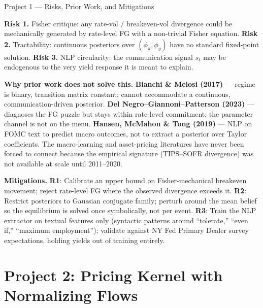 \documentclass[aspectratio=169, 11pt]{beamer}
\newcommand{\phipi}{\phi_{\pi}}
\newcommand{\phiy}{\phi_{y}}
\newcommand{\riskbox}[1]{%
  \begin{tcolorbox}[colback=accentred!8,colframe=accentred,boxrule=0.8pt,arc=2pt,left=4pt,right=4pt,top=2pt,bottom=2pt]
    #1\end{tcolorbox}}
\newcommand{\fixbox}[1]{%
  \begin{tcolorbox}[colback=accentblue!8,colframe=accentblue,boxrule=0.8pt,arc=2pt,left=4pt,right=4pt,top=2pt,bottom=2pt]
    #1\end{tcolorbox}}
\begin{document}
\begin{frame}{Project 1 --- Risks, Prior Work, and Mitigations}
\footnotesize

\riskbox{\textbf{Risk 1.} Fisher critique: any rate-vol / breakeven-vol divergence could be mechanically generated by rate-level FG with a non-trivial Fisher equation.
\quad\textbf{Risk 2.} Tractability: continuous posteriors over $(\phipi,\phiy)$ have no standard fixed-point solution.
\quad\textbf{Risk 3.} NLP circularity: the communication signal $s_t$ may be endogenous to the very yield response it is meant to explain.}

\vspace{0.15cm}
\textbf{Why prior work does not solve this.}
\textbf{Bianchi \& Melosi (2017)} --- regime is binary, transition matrix constant; cannot accommodate a continuous, communication-driven posterior.
\textbf{Del Negro--Giannoni--Patterson (2023)} --- diagnoses the FG puzzle but stays within rate-level commitment; the parameter channel is not on the menu.
\textbf{Hansen, McMahon \& Tong (2019)} --- NLP on FOMC text to predict macro outcomes, not to extract a posterior over Taylor coefficients.
The macro-learning and asset-pricing literatures have never been forced to connect because the empirical signature (TIPS--SOFR divergence) was not available at scale until 2011--2020.

\vspace{0.15cm}
\fixbox{\textbf{Mitigations.}
\textbf{R1}: Calibrate an upper bound on Fisher-mechanical breakeven movement; reject rate-level FG where the observed divergence exceeds it.
\textbf{R2}: Restrict posteriors to Gaussian conjugate family; perturb around the mean belief so the equilibrium is solved once symbolically, not per event.
\textbf{R3}: Train the NLP extractor on textual features only (syntactic patterns around ``tolerate,'' ``even if,'' ``maximum employment''); validate against NY Fed Primary Dealer survey expectations, holding yields out of training entirely.}

\end{frame}

\section{Project 2: Pricing Kernel with Normalizing Flows}
\end{document}
